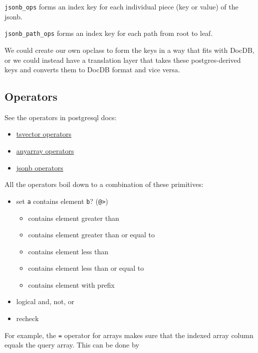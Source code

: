 \documentclass[
]{article}
\providecommand{\tightlist}{%
  \setlength{\itemsep}{0pt}\setlength{\parskip}{0pt}}
\begin{document}
\texttt{jsonb\_ops} forms an index key for each individual piece (key or
value) of the jsonb.

\texttt{jsonb\_path\_ops} forms an index key for each path from root to
leaf.

We could create our own opclass to form the keys in a way that fits with
DocDB, or we could instead have a translation layer that takes these
postgres-derived keys and converts them to DocDB format and vice versa.

\hypertarget{operators}{%
\subsection{Operators}\label{operators}}

See the operators in postgresql docs:

\begin{itemize}
\tightlist
\item
  \href{https://www.postgresql.org/docs/current/functions-textsearch.html}{tsvector
  operators}
\item
  \href{https://www.postgresql.org/docs/current/functions-array.html}{anyarray
  operators}
\item
  \href{https://www.postgresql.org/docs/current/functions-json.html}{jsonb
  operators}
\end{itemize}

All the operators boil down to a combination of these primitives:

\begin{itemize}
\tightlist
\item
  set \texttt{a} contains element \texttt{b}? (\texttt{@\textgreater{}})

  \begin{itemize}
  \tightlist
  \item
    contains element greater than
  \item
    contains element greater than or equal to
  \item
    contains element less than
  \item
    contains element less than or equal to
  \item
    contains element with prefix
  \end{itemize}
\item
  logical and, not, or
\item
  recheck
\end{itemize}

For example, the \texttt{=} operator for arrays makes sure that the
indexed array column equals the query array. This can be done by
\end{document}
